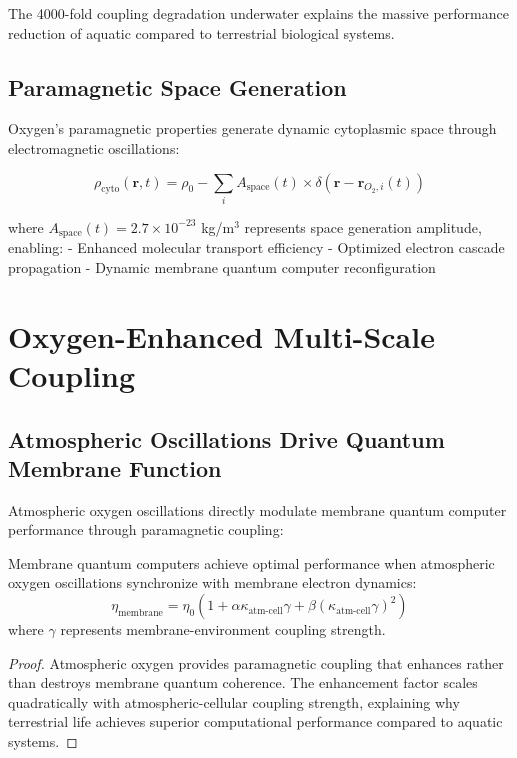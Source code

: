 \documentclass[twocolumn]{article}
\begin{document}
The 4000-fold coupling degradation underwater explains the massive performance reduction of aquatic compared to terrestrial biological systems.

\subsection{Paramagnetic Space Generation}

Oxygen's paramagnetic properties generate dynamic cytoplasmic space through electromagnetic oscillations:

\begin{equation}
\rho_{\text{cyto}}(\mathbf{r}, t) = \rho_0 - \sum_i A_{\text{space}}(t) \times \delta(\mathbf{r} - \mathbf{r}_{O_2,i}(t))
\end{equation}

where $A_{\text{space}}(t) = 2.7 \times 10^{-23}$ kg/m$^3$ represents space generation amplitude, enabling:
- Enhanced molecular transport efficiency
- Optimized electron cascade propagation
- Dynamic membrane quantum computer reconfiguration

\section{Oxygen-Enhanced Multi-Scale Coupling}

\subsection{Atmospheric Oscillations Drive Quantum Membrane Function}

Atmospheric oxygen oscillations directly modulate membrane quantum computer performance through paramagnetic coupling:

\begin{theorem}
Membrane quantum computers achieve optimal performance when atmospheric oxygen oscillations synchronize with membrane electron dynamics:
\begin{equation}
\eta_{\text{membrane}} = \eta_0 \left(1 + \alpha\kappa_{\text{atm-cell}}\gamma + \beta(\kappa_{\text{atm-cell}}\gamma)^2\right)
\end{equation}
where $\gamma$ represents membrane-environment coupling strength.
\end{theorem}

\begin{proof}
Atmospheric oxygen provides paramagnetic coupling that enhances rather than destroys membrane quantum coherence. The enhancement factor scales quadratically with atmospheric-cellular coupling strength, explaining why terrestrial life achieves superior computational performance compared to aquatic systems.
\end{proof}
\end{document}
